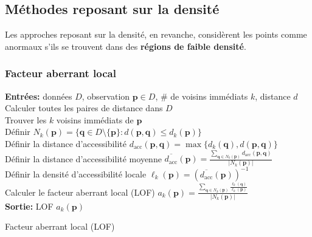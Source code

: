 \subsection{M\'ethodes reposant sur la densit\'e} %

Les approches reposant sur la densité, en revanche, considèrent les points comme anormaux s'ils se trouvent dans des \textbf{régions de faible densité}.

\subsubsection*{Facteur aberrant local} %

\begin{algorithm}[ht]
\SetAlgoLined
\textbf{Entr\'ees:} donn\'ees $D$, observation $\mathbf{p} \in D$, \# de voisins imm\'ediats $k$, distance $d$
\\ Calculer toutes les paires de distance dans $D$
\\
Trouver les $k$ voisins imm\'ediats de $\mathbf{p}$ 
\\ D\'efinir $N_k(\mathbf{p}) = \{ \mathbf{q} \in D \setminus \{\mathbf{p}\} : d(\mathbf{p}, \mathbf{q}) \leq d_k(\mathbf{p}) \}$
\\ D\'efinir la distance d'accessibilité
$d_{\text{acc}}(\mathbf{p},\mathbf{q}) = \max\{d_k(\mathbf{q}), d(\mathbf{p},\mathbf{q})\}$
\\ D\'efinir la distance d'accessibilité moyenne  $\overline{d_{\text{acc}}}(\mathbf{p}) 
= \frac{\sum_{\mathbf{q} \in N_k(\mathbf{p})} d_{\text{acc}}(\mathbf{p},\mathbf{q})}{\lvert N_k(\mathbf{p}) \rvert}$
\\ D\'efinir la densit\'e d'accessibilité locale
$\ell_k(\mathbf{p}) = \left( \overline{d_{\text{acc}}}(\mathbf{p}) \right)^{-1}$
\\Calculer le facteur aberrant local (LOF) 
$a_k(\mathbf{p})
= \frac{\sum_{\mathbf{q} \in N_k(\mathbf{p})} \frac{\ell_k(\mathbf{q})}{\ell_k(\mathbf{p})}}{\lvert N_k(\mathbf{p}) \rvert}$
\\ \textbf{Sortie:} LOF $a_k(\mathbf{p})$
\caption{Facteur aberrant local (LOF)}
\label{alg:LOF}
\end{algorithm}

